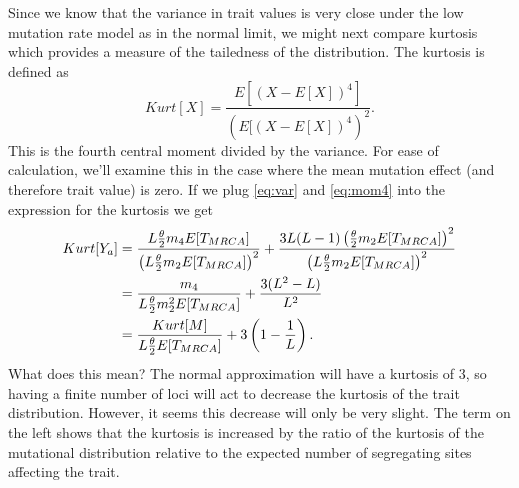 Since we know that the variance in trait values is very close under the low
mutation rate model as in the normal limit, we might next compare kurtosis which
provides a measure of the tailedness of the distribution. The kurtosis is
defined as
\begin{equation}
  Kurt[X]=\frac{E[(X-E[X])^4]}{(E[(X-E[X])^4)^2}.
\end{equation}
This is the fourth central moment divided by the variance. For ease of
calculation, we'll examine this in the case where the mean mutation effect (and
therefore trait value) is zero. If we plug \eqref{eq:var} and \eqref{eq:mom4}
into the expression for the kurtosis we get
\begin{align}
  \label{eq:kurtosis_single}
  Kurt[Y_a] &= \frac{L\frac{\theta}{2} m_4 E[T_{MRCA}]}{\left(L\frac{\theta}{2} m_2 E[T_{MRCA}]\right)^2} +
  \frac{3L(L-1)\left( \frac{\theta}{2} m_2  E[T_{MRCA}]\right)^2}{\left(L\frac{\theta}{2} m_2 E[T_{MRCA}]\right)^2} \nonumber \\
  &= \frac{m_4}{L\frac{\theta}{2} m_2^2E[T_{MRCA}]} + \frac{3(L^2-L)}{L^2} \nonumber \\
  &= \frac{Kurt[M]}{L\frac{\theta}{2} E[T_{MRCA}]} + 3\left( 1 - \frac{1}{L} \right).
\end{align}
What does this mean? The normal approximation will have a kurtosis of $3$, so
having a finite number of loci will act to decrease the kurtosis of the trait
distribution. However, it seems this decrease will only be very slight. The term
on the left shows that the kurtosis is increased by the ratio of the kurtosis of
the mutational distribution relative to the expected number of segregating sites
affecting the trait.
